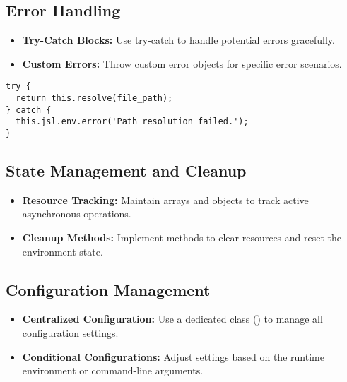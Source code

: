 \documentclass[12pt,a4paper]{article}
\begin{document}
\subsection{Error Handling}
\begin{itemize}
  \item \textbf{Try-Catch Blocks:} Use try-catch to handle potential errors gracefully.
  
  \item \textbf{Custom Errors:} Throw custom error objects for specific error scenarios.
\end{itemize}

\begin{lstlisting}[style=JavaScriptStyle]
try {
  return this.resolve(file_path);
} catch {
  this.jsl.env.error('Path resolution failed.');
}
\end{lstlisting}

\subsection{State Management and Cleanup}
\begin{itemize}
  \item \textbf{Resource Tracking:} Maintain arrays and objects to track active asynchronous operations.
  
  \item \textbf{Cleanup Methods:} Implement methods to clear resources and reset the environment state.
\end{itemize}

\subsection{Configuration Management}
\begin{itemize}
  \item \textbf{Centralized Configuration:} Use a dedicated class () to manage all configuration settings.
  
  \item \textbf{Conditional Configurations:} Adjust settings based on the runtime environment or command-line arguments.
\end{itemize}
\end{document}
